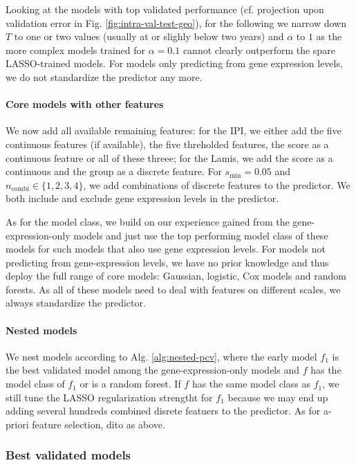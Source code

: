 Looking at the models with top validated performance (cf. projection upon validation error in Fig. 
\ref{fig:intra-val-test-geo}), for the following we narrow down $T$ to one or 
two values (usually at or slighly below two years) and $\alpha$ to $1$ as the more complex models 
trained for $\alpha = \num{0.1}$ cannot clearly outperform the spare LASSO-trained models. For 
models only predicting from gene expression levels, we do not standardize the predictor any more.

\paragraph{Core models with other features}
We now add all available remaining features: for the 
IPI, we either add the five continuous features (if available), the five threholded features, the 
score as a continuous feature or all of these threee; for the Lamis, %
we add the score as a continuous and the group as a discrete feature. For $s_\text{min} = \num{0.05}$ 
and $n_\text{combi} \in \{1, 2, 3, 4 \}$, we add combinations of discrete features to the predictor. 
We both include and exclude gene expression levels in the predictor.

As for the model class, we build on our experience gained from the gene-expression-only models and 
just use the top performing model class of these models for such models that also use gene 
expression levels. For models not predicting from gene-expression levels, we have no prior 
knowledge and thus deploy the full range of core models: Gaussian, logistic, Cox models and random 
forests. As all of these models need to deal with features on different scales, we always 
standardize the predictor.


\paragraph{Nested models}
We nest models according to Alg. \ref{alg:nested-pcv}, where the early model $f_1$ is the best 
validated model among the gene-expression-only models and $f$ has the model class of $f_1$ or is 
a random forest. If $f$ has the same model class as $f_1$, we still tune the LASSO regularization 
strengtht for $f_1$ because we may end up adding several hundreds combined disrete featuers to the 
predictor. As for a-priori feature selection, dito as above.

\subsubsection{Best validated models}

